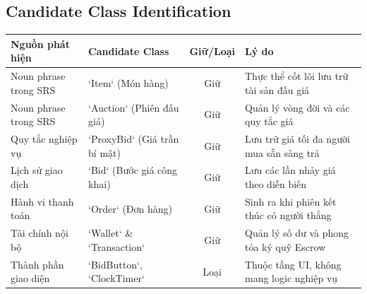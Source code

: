 \documentclass[11pt,a4paper]{article}
\begin{document}
\subsection{Candidate Class Identification}
\begin{table}[H]
    \centering
    \small
    \begin{tabularx}{\textwidth}{|l|l|c|X|}
        \hline
        \textbf{Nguồn phát hiện} & \textbf{Candidate Class} & \textbf{Giữ/Loại} & \textbf{Lý do} \\ \hline
        Noun phrase trong SRS & `Item` (Món hàng) & Giữ & Thực thể cốt lõi lưu trữ tài sản đấu giá \\ \hline
        Noun phrase trong SRS & `Auction` (Phiên đấu giá) & Giữ & Quản lý vòng đời và các quy tắc giá \\ \hline
        Quy tắc nghiệp vụ & `ProxyBid` (Giá trần bí mật) & Giữ & Lưu trữ giá tối đa người mua sẵn sàng trả \\ \hline
        Lịch sử giao dịch & `Bid` (Bước giá công khai) & Giữ & Lưu các lần nhảy giá theo diễn biến \\ \hline
        Hành vi thanh toán & `Order` (Đơn hàng) & Giữ & Sinh ra khi phiên kết thúc có người thắng \\ \hline
        Tài chính nội bộ & `Wallet` \& `Transaction` & Giữ & Quản lý số dư và phong tỏa ký quỹ Escrow \\ \hline
        Thành phần giao diện & `BidButton`, `ClockTimer` & Loại & Thuộc tầng UI, không mang logic nghiệp vụ \\ \hline
    \end{tabularx}
\end{table}
\end{document}

